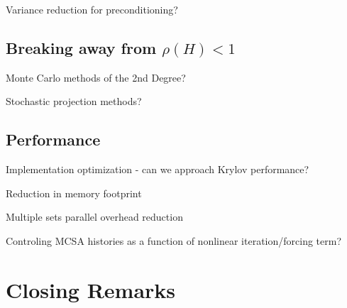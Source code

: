 Variance reduction for preconditioning?

\subsection{Breaking away from $\rho(H) < 1$}
\label{subsec:future_spec_rad}

Monte Carlo methods of the 2nd Degree?

Stochastic projection methods?

\subsection{Performance}
\label{subsec:future_performance}

Implementation optimization - can we approach Krylov performance?

Reduction in memory footprint

Multiple sets parallel overhead reduction

Controling MCSA histories as a function of nonlinear iteration/forcing
term?

\section{Closing Remarks\ }
\label{sec:closing}
